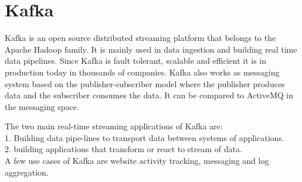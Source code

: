 \section{Kafka}


Kafka is an open source distributed streaming platform that belongs 
to the Apache Hadoop family. It is mainly used in data ingestion and 
building real time data pipelines. Since Kafka is fault tolerant, 
scalable and efficient it is in production today in thousands of 
companies. Kafka also works as messaging system based on the 
publisher-subscriber model where the publisher produces data and 
the subscriber consumes the data. It can be compared to ActiveMQ 
in the messaging space. \cite{hid-sp18-517-ApacheKafka}


The two main real-time streaming applications of Kafka are: \\
1. Building data pipe-lines to transport data between systems of 
   applications.\\
2. building applications that transform or react to stream of data. \\

A few use cases of Kafka are website activity tracking, messaging 
and log aggregation. \cite{hid-sp18-517-ApacheKafka}


